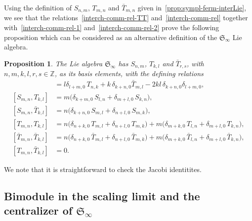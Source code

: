 \documentclass[11pt]{article}
\newcommand{\strt}{T}
\newcommand{\bstrt}{\bar{\strt}}
\newcommand{\oZ}{\mathbb{Z}}
\newcommand{\interLie}{\mathfrak{S}}
\newcommand{\interinfin}{\interLie_{\infty}}
\newcommand{\enrg}{S}
\newtheorem{prop}[subsubsection]{Proposition}
\theoremstyle{definition}
\begin{document}
Using the definition of $\enrg_{n,m}$, $\strt_{m,n}$ and $\bstrt_{m,n}$ given in~\eqref{prop:sympl-ferm-interLie}, we see that the relations~\eqref{interch-comm-rel-TT} and~\eqref{interch-comm-rel} together with~\eqref{interch-comm-rel-1} and~\eqref{interch-comm-rel-2} prove the following proposition which can be considered as an alternative definition of the $\interinfin$ Lie algebra.
\begin{prop}\label{prop:interch-rel}
The  Lie algebra $\interinfin$ has $\enrg_{n,m}$, $\strt_{k,l}$ and $\bstrt_{r,s}$, with $n,m,k,l,r,s\in\oZ$, as its basis elements,  with the defining relations
\begin{align}
[\enrg_{n,m} , \enrg_{k,l} ] &= l\delta_{l+m,0}\, \strt_{n,k} +
k\,\delta_{k+n,0} \bstrt_{m,l}  - 2kl\,\delta_{k+n,0}\delta_{l+m,0},\\
[\enrg_{m,n} , \strt_{k,l} ] &= m \bigl(\delta_{k+m,0}\, \enrg_{l,n} +
\delta_{m+l,0} \, \enrg_{k,n}  \bigr),\\
[\enrg_{m,n} , \bstrt_{k,l} ] &
= n \bigl(\delta_{k+n,0}\, \enrg_{m,l} +
\delta_{n+l,0} \, \enrg_{m,k}  \bigr),\\
[\strt_{m,n},\strt_{k,l}] &= n \bigl(\delta_{n+k,0}\, \strt_{m,l}+
\delta_{n+l,0} \,\strt_{m,k} \bigr) + m \bigl(\delta_{m+k,0}\, \strt_{l,n} +
\delta_{m+l,0} \,\strt_{k,n}  \bigr),\\
[\bstrt_{m,n},\bstrt_{k,l}] &= n \bigl(\delta_{n+k,0}\, \bstrt_{m,l}+
\delta_{n+l,0} \,\bstrt_{m,k} \bigr) + m \bigl(\delta_{m+k,0}\, \bstrt_{l,n} +
\delta_{m+l,0} \,\bstrt_{k,n}  \bigr),\\
[\strt_{m,n},\bstrt_{k,l}] &= 0.
\end{align}
\end{prop}

We note that it is straightforward to check the Jacobi identitites.

\subsection{Bimodule in the scaling limit and the centralizer of $\interinfin$}\label{sec:bimod-scal-lim}
\end{document}
